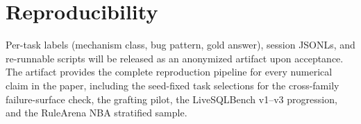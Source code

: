 \documentclass[conference]{IEEEtran}
\begin{document}
\section{Reproducibility}
\label{app:artifact}
Per-task labels (mechanism class, bug pattern, gold answer), session JSONLs, and re-runnable scripts will be released as an anonymized artifact upon acceptance. The artifact provides the complete reproduction pipeline for every numerical claim in the paper, including the seed-fixed task selections for the cross-family failure-surface check, the grafting pilot, the LiveSQLBench v1--v3 progression, and the RuleArena NBA stratified sample.
\end{document}
